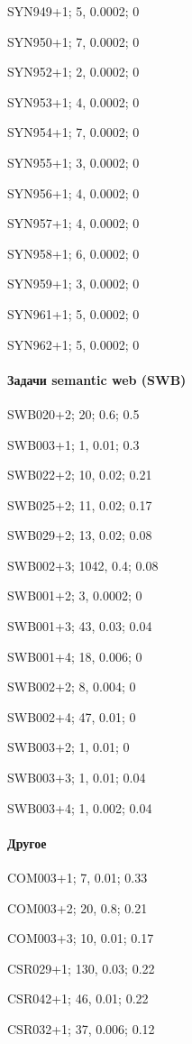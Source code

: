 SYN949+1; 5, 0.0002; 0

SYN950+1; 7, 0.0002; 0

SYN952+1; 2, 0.0002; 0

SYN953+1; 4, 0.0002; 0

SYN954+1; 7, 0.0002; 0

SYN955+1; 3, 0.0002; 0

SYN956+1; 4, 0.0002; 0

SYN957+1; 4, 0.0002; 0

SYN958+1; 6, 0.0002; 0

SYN959+1; 3, 0.0002; 0

SYN961+1; 5, 0.0002; 0

SYN962+1; 5, 0.0002; 0

\paragraph{Задачи semantic web (SWB)}

SWB020+2; 20; 0.6; 0.5

SWB003+1; 1, 0.01; 0.3

SWB022+2; 10, 0.02; 0.21

SWB025+2; 11, 0.02; 0.17

SWB029+2; 13, 0.02; 0.08

SWB002+3; 1042, 0.4; 0.08

SWB001+2; 3, 0.0002; 0

SWB001+3; 43, 0.03; 0.04

SWB001+4; 18, 0.006; 0

SWB002+2; 8, 0.004; 0

SWB002+4; 47, 0.01; 0

SWB003+2; 1, 0.01; 0

SWB003+3; 1, 0.01; 0.04

SWB003+4; 1, 0.002; 0.04


\paragraph{Другое}

COM003+1; 7, 0.01; 0.33

COM003+2; 20, 0.8; 0.21

COM003+3; 10, 0.01; 0.17

CSR029+1; 130, 0.03; 0.22

CSR042+1; 46, 0.01; 0.22

CSR032+1; 37, 0.006; 0.12

